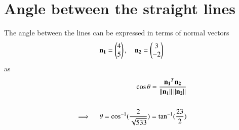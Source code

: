 \documentclass[journal,12pt,twocolumn]{IEEEtran}
\begin{document}
\section{Angle between the straight lines}
The angle between the lines can be expressed in terms of normal vectors 
\begin{align}
	\mathbf{n_1}=\begin{pmatrix}4\\5\end{pmatrix} , \quad \mathbf{n_2}=\begin{pmatrix}3\\-2\end{pmatrix}
\end{align}
as
\begin{align}
	\cos\theta=\frac{\mathbf{n_1}^T\mathbf{n_2}}{\left\lVert\mathbf{n_1}\right\rVert\left\lVert\mathbf{n_2}\right\rVert} \\
				\nonumber \\
	\implies \quad \theta=\cos^{-1}({\frac{2}{\sqrt{533}}}) = \tan^{-1}(\frac{23}{2})
\end{align}
\end{document}
